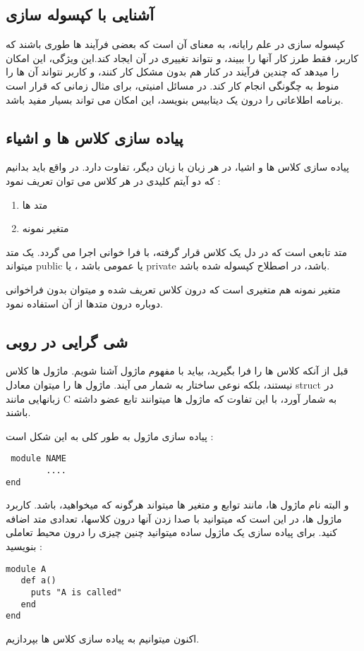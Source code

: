 \documentclass[11pt]{article}
\begin{document}
\subsection{آشنایی با کپسوله سازی}
کپسوله سازی
 در علم رایانه، به معنای آن است که بعضی فرآیند ها طوری باشند که کاربر، فقط طرز کار آنها را ببیند، و نتواند تغییری در آن ایجاد کند.این ویژگی، این امکان را میدهد که چندین فرآیند در کنار هم بدون مشکل کار کنند، و کاربر نتواند آن ها را منوط به چگونگی انجام کار کند. در مسائل امنیتی، برای مثال زمانی که قرار است برنامه اطلاعاتی را درون یک دیتابیس بنویسد، این امکان می تواند بسیار مفید باشد. 
 \subsection{پیاده سازی کلاس ها و اشیاء}
 پیاده سازی کلاس ها و اشیا، در هر زبان با زبان دیگر، تفاوت دارد. در واقع باید بدانیم که دو آیتم کلیدی در هر کلاس می توان تعریف نمود :
 \begin{enumerate}
 \item متد ها
 \item متغیر نمونه
 \end{enumerate}
 متد
 تابعی است که در دل یک کلاس قرار گرفته، با فرا خوانی اجرا می گردد. یک متد میتواند public یا عمومی باشد ، یا private باشد، در اصطلاح کپسوله شده باشد. 
 
 متغیر نمونه
 هم متغیری است که درون کلاس تعریف شده و میتوان بدون فراخوانی دوباره درون متدها از آن استفاده نمود. 
 \subsection{شی گرایی در روبی}
 قبل از آنکه کلاس ها را فرا بگیرید، بیاید با مفهوم ماژول آشنا شویم. ماژول ها کلاس نیستند، بلکه نوعی ساختار
 به شمار می آیند. ماژول ها را میتوان معادل struct در زبانهایی مانند C به شمار آورد، با این تفاوت که ماژول ها میتوانند تابع عضو
 داشته باشند. 
 
 پیاده سازی ماژول به طور کلی به این شکل است :
\begin{latin}
\begin{verbatim}
 module NAME
        ....
end
\end{verbatim}
\end{latin}
و البته نام ماژول ها، مانند توابع و متغیر ها میتواند هرگونه که میخواهید، باشد. کاربرد ماژول ها، در این است که میتوانید با صدا زدن آنها درون کلاسها، تعدادی متد اضافه کنید. برای پیاده سازی یک ماژول ساده میتوانید چنین چیزی را درون محیط تعاملی بنویسید :
\begin{latin}
\begin{verbatim}
module A
   def a()
     puts "A is called"
   end
end
\end{verbatim}
\end{latin}
اکنون میتوانیم به پیاده سازی کلاس ها بپردازیم. 
\end{document}
